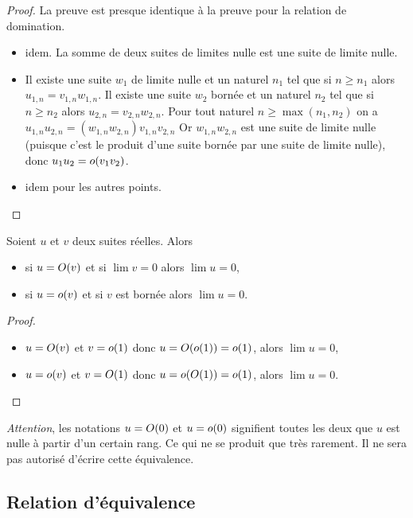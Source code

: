 \begin{proof}
  La preuve est presque identique à la preuve pour la relation de domination.
  \begin{itemize}
  \item idem. La somme de deux suites de limites nulle est une suite de limite nulle.
  \item Il existe une suite \(w_1\) de limite nulle et un naturel \(n_1\) tel que si \(n \geqslant n_1\) alors \(u_{1,n}=v_{1,n} w_{1,n}\). Il existe une suite \(w_2\) bornée et un naturel \(n_2\) tel que si \(n \geqslant n_2\) alors \(u_{2,n}=v_{2,n} w_{2,n}\). Pour tout naturel \(n \geqslant \max(n_1,n_2)\) on a \(u_{1,n}u_{2,n} = (w_{1,n}w_{2,n}) v_{1,n}v_{2,n}\) Or \(w_{1,n}w_{2,n}\) est une suite de limite nulle (puisque c'est le produit d'une suite bornée par une suite de limite nulle), donc \(u_1u_2=o\mathopen{}\left(v_1 v_2\right)\).
  \item idem pour les autres points.
  \end{itemize}
\end{proof}
\begin{prop}
  Soient \(u\) et \(v\) deux suites réelles. Alors
  \begin{itemize}
  \item si \(u=O\mathopen{}\left(v\right)\) et si \(\lim v=0\) alors \(\lim u=0\),
  \item si \(u=o\mathopen{}\left(v\right)\) et si \(v\) est bornée alors \(\lim u=0\).
  \end{itemize}
\end{prop}
\begin{proof}
  \begin{itemize}
  \item \(u=O\mathopen{}\left(v\right)\) et \(v=o\mathopen{}\left(1\right)\) donc \(u=O\mathopen{}\left(o\mathopen{}\left(1\right)\right)=o\mathopen{}\left(1\right)\), alors \(\lim u =0\),
  \item \(u=o\mathopen{}\left(v\right)\) et \(v=O\mathopen{}\left(1\right)\) donc \(u=o\mathopen{}\left(O\mathopen{}\left(1\right)\right)=o\mathopen{}\left(1\right)\), alors \(\lim u =0\).
  \end{itemize}
\end{proof}

\emph{Attention}, les notations \(u=O\mathopen{}\left(0\right)\) et \(u=o\mathopen{}\left(0\right)\) signifient toutes les deux que \(u\) est nulle à partir d'un certain rang. Ce qui ne se produit que très rarement. Il ne sera pas autorisé d'écrire cette équivalence.

\subsection{Relation d'équivalence}


